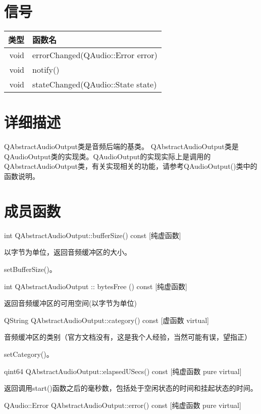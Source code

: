 \section{信号}

\begin{tabular}{|r|l|}
\hline
类型&函数名\\
\hline
void&	errorChanged(QAudio::Error error)\\
\hline
void&	notify()\\
\hline
void&	stateChanged(QAudio::State state)\\
\hline
\end{tabular}

\section{详细描述}

QAbstractAudioOutput类是音频后端的基类。 QAbstractAudioOutput类是
QAudioOutput类的实现类。QAudioOutput的实现实际上是调用的
QAbstractAudioOutput类，有关实现相关的功能，请参考QAudioOutput()类中的
函数说明。

\section{成员函数}

int QAbstractAudioOutput::bufferSize() const [纯虚函数] 

以字节为单位，返回音频缓冲区的大小。


\begin{notice}[另请参阅]
setBufferSize()。
\end{notice}

int QAbstractAudioOutput :: bytesFree () const [纯虚函数] 

返回音频缓冲区的可用空间(以字节为单位)

QString QAbstractAudioOutput::category() const [虚函数 virtual] 

音频缓冲区的类别（官方文档没有，这是我个人经验，当然可能有误，望指正） 

\begin{notice}[另请参阅]
setCategory()。
\end{notice}

qint64 QAbstractAudioOutput::elapsedUSecs() const [纯虚函数 pure virtual] 

返回调用start()函数之后的毫秒数，包括处于空闲状态的时间和挂起状态的时间。

QAudio::Error QAbstractAudioOutput::error() const [纯虚函数 pure
virtual] 

